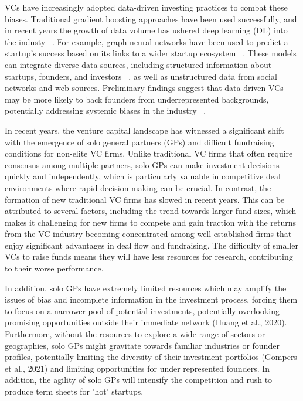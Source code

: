\documentclass[a4paper, oneside]{discothesis}
\begin{document}
VCs have increasingly adopted data-driven investing practices to combat these biases. 
Traditional gradient boosting approaches have been used successfully, and in recent years the growth of data volume has ushered deep learning (DL) into the industy ~\cite{eqt}.
For example, graph neural networks have been used to predict a startup's success based on its links to a wider startup ecosystem ~\cite{korea}. 
These models can integrate diverse data sources, including structured information about startups, founders, and investors ~\cite{corea}, as well as unstructured data from social networks and web sources. 
Preliminary findings suggest that data-driven VCs may be more likely to back founders from underrepresented backgrounds, potentially addressing systemic biases in the industry ~\cite{futureVC}.

In recent years, the venture capital landscape has witnessed a significant shift with the emergence of solo general partners (GPs) and difficult fundraising conditions for non-elite VC firms. 
Unlike traditional VC firms that often require consensus among multiple partners, solo GPs can make investment decisions quickly and independently, which is particularly valuable in competitive deal environments where rapid decision-making can be crucial.
In contrast, the formation of new traditional VC firms has slowed in recent years. This can be attributed to several factors, including the trend towards larger fund sizes, which makes it challenging for new firms to compete and gain traction with the returns from the VC industry becoming concentrated among well-established firms that enjoy significant advantages in deal flow and fundraising. 
The difficulty of smaller VCs to raise funds means they will have less resources for research, contributing to their worse performance.

In addition, solo GPs have extremely limited resources which may amplify the issues of bias and incomplete information in the investment process, forcing them to  focus on a narrower pool of potential investments, potentially overlooking promising opportunities outside their immediate network (Huang et al., 2020). 
Furthermore, without the resources to explore a wide range of sectors or geographies, solo GPs might gravitate towards familiar industries or founder profiles, potentially limiting the diversity of their investment portfolios (Gompers et al., 2021) and limiting opportunities for under represented founders.
In addition, the agility of solo GPs will intensify the competition and rush to produce term sheets for 'hot' startups. 
\end{document}
